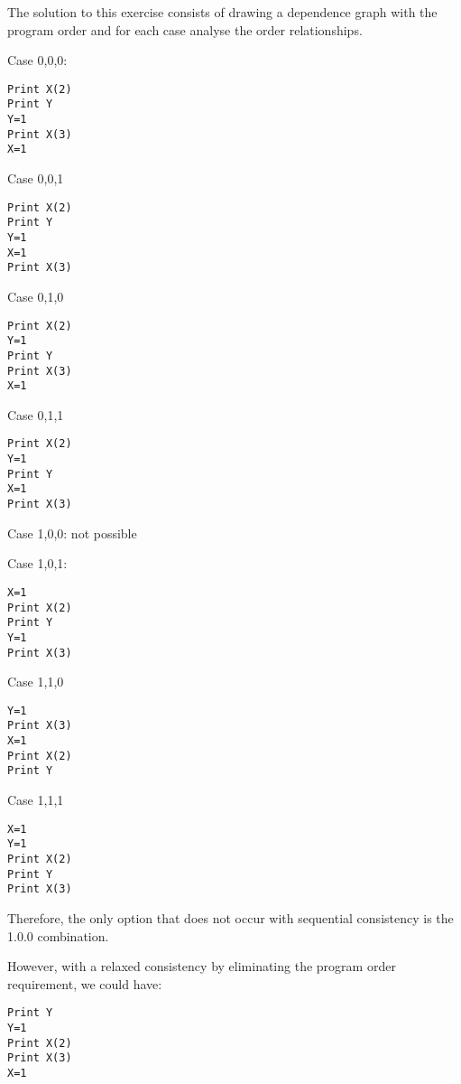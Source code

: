 \begin{acsolution}\end{acsolution}

The solution to this exercise consists of drawing a dependence graph with the program order
 and for each case analyse the order relationships.


Case 0,0,0:

\begin{lstlisting}
Print X(2)
Print Y
Y=1
Print X(3)
X=1
\end{lstlisting}

Case 0,0,1

\begin{lstlisting}
Print X(2)
Print Y
Y=1
X=1
Print X(3)
\end{lstlisting}

Case 0,1,0

\begin{lstlisting}
Print X(2)
Y=1
Print Y
Print X(3)
X=1
\end{lstlisting}

Case 0,1,1

\begin{lstlisting}
Print X(2)
Y=1
Print Y
X=1
Print X(3)
\end{lstlisting}

Case 1,0,0: {\color{red}not possible}

Case 1,0,1:

\begin{lstlisting}
X=1
Print X(2)
Print Y
Y=1
Print X(3)
\end{lstlisting}

Case 1,1,0

\begin{lstlisting}
Y=1
Print X(3)
X=1
Print X(2)
Print Y
\end{lstlisting}

Case 1,1,1

\begin{lstlisting}
X=1
Y=1
Print X(2)
Print Y
Print X(3)
\end{lstlisting}

Therefore, the only option that does not occur with sequential consistency is the 1.0.0 combination.

However, with a relaxed consistency by eliminating the program order requirement, we could have:


\begin{lstlisting}
Print Y
Y=1
Print X(2)
Print X(3)
X=1
\end{lstlisting}
